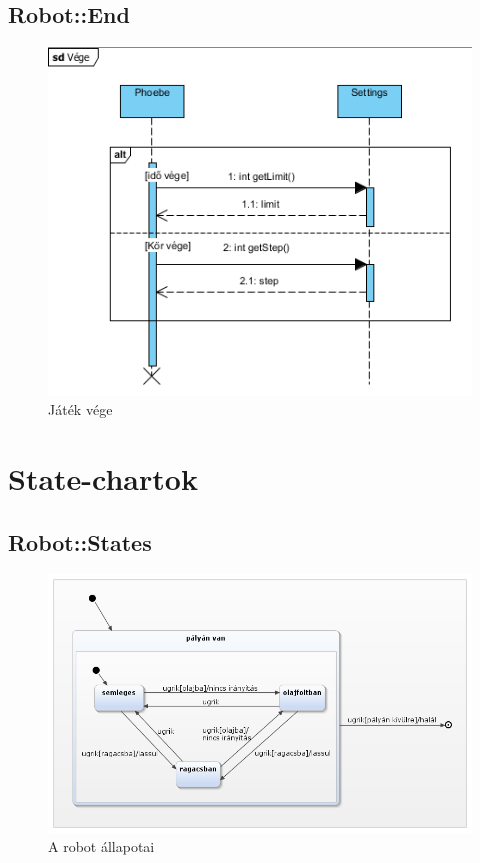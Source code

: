 \subsection{Robot::End}
\begin{figure}[h]
\begin{center}
\includegraphics[width=17cm]{images/end.PNG}
\caption{Játék vége}
\label{fig:example11}
\end{center}
\end{figure}
\pagebreak



\section{State-chartok}
\subsection{Robot::States}
\begin{figure}[h]
\begin{center}
\includegraphics[width=17cm]{images/robot.png}
\caption{A robot állapotai}
\label{fig:example12}
\end{center}
\end{figure}

